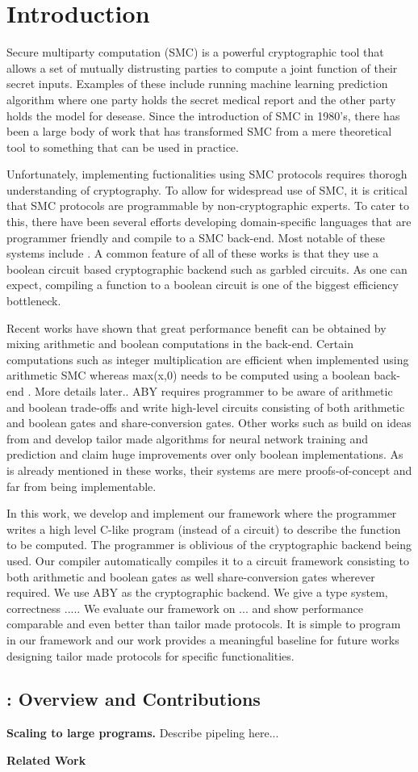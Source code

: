 \section{Introduction}
\label{sec:intro}

Secure multiparty computation \cite{yao,gmw} (SMC) is a powerful cryptographic tool that allows a set of mutually distrusting parties to compute a joint function of their secret inputs. Examples of these include running machine learning prediction algorithm where one party holds the secret medical report and the other party holds the model for desease. Since the introduction of SMC in 1980's, there has been a large body of work \cite{..} that has transformed SMC from a mere theoretical tool to something that can be used in practice. 

Unfortunately, implementing fuctionalities using SMC protocols requires thorogh understanding of cryptography. To allow for widespread use of SMC, it is critical that SMC protocols are programmable by non-cryptographic experts. To cater to this, there have been several efforts developing domain-specific languages that are programmer friendly and compile to a SMC back-end. Most notable of these systems include \cite{...}. A common feature of all of these works is that they use a boolean circuit based cryptographic backend such as garbled circuits. As one can expect, compiling a function to a boolean circuit is one of the biggest efficiency bottleneck. 

Recent works \cite{aby,secureml,minion} have shown that great performance benefit can be obtained by mixing arithmetic and boolean computations in the back-end. Certain computations such as integer multiplication are efficient when implemented using arithmetic SMC \cite{gmw} whereas max(x,0) needs to be computed using a boolean back-end \cite{yao}. More details later.. ABY \cite{aby} requires programmer to be aware of arithmetic and boolean trade-offs and  write high-level circuits consisting of both arithmetic and boolean gates and share-conversion gates. Other works such as \cite{secureml,minion} build on ideas from \cite{aby} and develop tailor made algorithms for neural network training and prediction \cite{ml} and claim huge improvements over only boolean implementations. As is already mentioned in these works, their systems are mere proofs-of-concept and far from being implementable.

In this work, we develop and implement our framework \tool where the programmer writes a high level C-like program (instead of a circuit) to describe the function to be computed. The programmer is oblivious of the cryptographic backend being used. Our compiler automatically compiles it to a circuit framework consisting to both arithmetic and boolean gates as well share-conversion gates wherever required. We use ABY as the cryptographic backend. We give a type system, correctness ..... We evaluate our framework on ... and show performance comparable and even better than tailor made protocols. It is simple to program in our framework and our work provides a meaningful baseline for future works designing tailor made protocols for specific functionalities.

\subsection{\tool: Overview and Contributions}

\noindent\textbf{Scaling to large programs.} Describe pipeling here...

\noindent\textbf{Related Work}
\cite{lambdaps,wysteria}